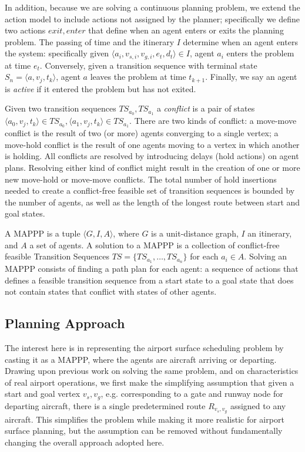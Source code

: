 \documentclass[letterpaper, 10 pt, conference]{ieeeconf}
\begin{document}
In addition, because we are solving a continuous planning problem, we extend the action model to include actions not assigned by the planner; specifically we define two actions $exit, enter$ that define when an agent enters or exits the planning problem. The passing of time and the itinerary $I$ determine when an agent enters the system: specifically given $\langle a_i, v_{s,i}, v_{g,i}, e_t, d_t \rangle \in I$, agent $a_i$ enters the problem at time $e_t$. Conversely, given a transition sequence with terminal state $S_n = \langle a, v_j, t_k \rangle$, agent $a$ leaves the problem at time $t_{k+1}$.  Finally, we say an agent is {\em active} if it  entered the problem but has not exited.

Given two transition sequences $TS_{a_0}, TS_{a_1}$  a {\em conflict} is a pair of states $\langle a_0, v_j, t_k \rangle \in TS_{a_0}, \langle a_1, v_j, t_k \rangle \in TS_{a_1}$. There are two kinds of conflict: a move-move conflict is the result of two (or more) agents converging to a single vertex; a move-hold conflict is the result of one agents moving to a vertex in which another is holding. All conflicts are resolved by introducing delays (hold actions) on agent plans. Resolving either kind of conflict might result in the creation of one or more new move-hold or move-move conflicts. The total number of hold insertions needed to create a conflict-free feasible set of transition sequences is bounded by the number of agents, as well as the length of the longest route between start and goal states.

A MAPPP is a tuple $\langle G, I, A \rangle$, where $G$ is a unit-distance graph, $I$ an itinerary, and $A$ a set of agents. A solution to a MAPPP is a collection of conflict-free feasible Transition Sequences $TS = \{TS_{a_1}, \ldots, TS_{a_n}\}$ for each $a_i \in A$. Solving an MAPPP consists of finding a path plan for each agent: a sequence of actions that defines a feasible transition sequence from a start state to a goal state that does not contain states that conflict with states of other agents.
\subsection{Planning Approach}

The interest here is in representing the airport surface scheduling problem by casting it as a MAPPP, where the agents are aircraft arriving or departing. Drawing upon previous work on solving the same problem, and on characteristics of real airport operations, we first make the simplifying assumption that given a start and goal vertex $v_s, v_g$, e.g. corresponding to a gate and runway node for departing aircraft, there is a single predetermined route $R_{v_s, v_g}$ assigned to any aircraft. This simplifies the problem while making it more realistic for airport surface planning, but the assumption can be removed without fundamentally changing the overall approach adopted here.
\end{document}
